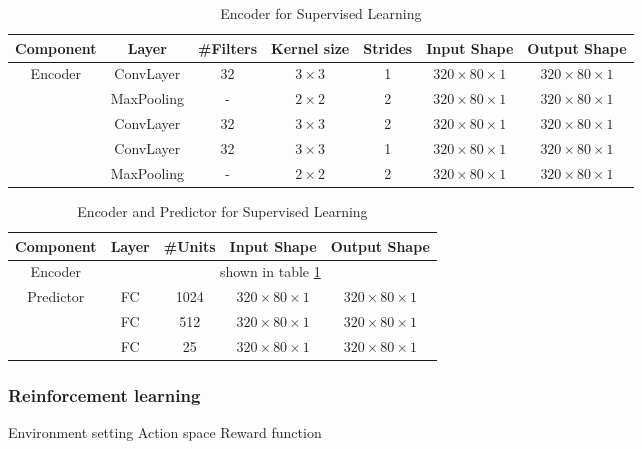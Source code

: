 \documentclass[a4paper]{article}
\begin{document}
\begin{table}[htbp]
\centering
\begin{tabular}{|c|c|c|c|c|c|c|}
\hline
Component & Layer & \#Filters & Kernel size & Strides & Input Shape & Output Shape  \\ \hline
\multirow{4}{*}{Encoder} & ConvLayer & 32 & $3 \times 3$ & 1 & $320 \times 80 \times 1$ & $320 \times 80 \times 1$ \\
 & MaxPooling & -  & $2 \times 2$ & 2 & $320 \times 80 \times 1$ & $320 \times 80 \times 1$ \\
 & ConvLayer & 32 & $3 \times 3$ & 2 & $320 \times 80 \times 1$ & $320 \times 80 \times 1$ \\
 & ConvLayer & 32 & $3 \times 3$ & 1 & $320 \times 80 \times 1$ & $320 \times 80 \times 1$ \\
 & MaxPooling & -  & $2 \times 2$ & 2 & $320 \times 80 \times 1$ & $320 \times 80 \times 1$ \\ \hline
\end{tabular}
\caption{Encoder for Supervised Learning}
\label{table:nn_supervised_encoder}
\end{table}

\begin{table}[htbp]
\centering
\begin{tabular}{|c|c|c|c|c|}
\hline
Component & Layer & \#Units & Input Shape & Output Shape  \\ \hline
Encoder & \multicolumn{4}{|c|}{shown in table \ref{table:nn_supervised_encoder}} \\ \hline
\multirow{3}{*}{Predictor} & FC & 1024 & $320 \times 80 \times 1$ & $320 \times 80 \times 1$ \\
 & FC & 512  & $320 \times 80 \times 1$ & $320 \times 80 \times 1$ \\
 & FC & 25   &  $320 \times 80 \times 1$ & $320 \times 80 \times 1$ \\ \hline
\end{tabular}
\caption{Encoder and Predictor for Supervised Learning}
\label{table:nn_supervised_whole}
\end{table}

\subsubsection{Reinforcement learning}
Environment setting
Action space
Reward function
\end{document}
